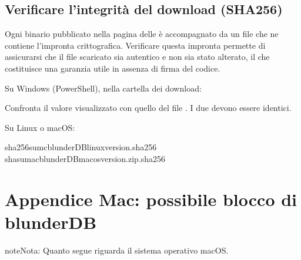 \documentclass[letterpaper,10pt,italian]{sphinxmanual}
\begin{document}
\subsection{Verificare l’integrità del download (SHA256)}
\label{\detokenize{annexe_windows_securite:verifier-l-integrite-du-telechargement-sha256}}
\sphinxAtStartPar
Ogni binario pubblicato nella pagina delle  è accompagnato da un file  che ne contiene l’impronta crittografica. Verificare questa impronta permette di assicurarsi che il file scaricato sia autentico e non sia stato alterato, il che costituisce una garanzia utile in assenza di firma del codice.

\sphinxAtStartPar
Su Windows (PowerShell), nella cartella dei download:

\begin{sphinxVerbatim}[commandchars=\\\{\}]
   
\end{sphinxVerbatim}

\sphinxAtStartPar
Confronta il valore visualizzato con quello del file . I due devono essere identici.

\sphinxAtStartPar
Su Linux o macOS:

\begin{sphinxVerbatim}[commandchars=\\\{\}]
sha256sum\PYGZhy{}cblunderDB\PYGZhy{}linux\PYGZhy{}\PYGZlt{}version\PYGZgt{}.sha256
shasum\PYGZhy{}a\PYGZhy{}cblunderDB\PYGZhy{}macos\PYGZhy{}\PYGZlt{}version\PYGZgt{}.zip.sha256
\end{sphinxVerbatim}

\sphinxstepscope


\section{Appendice Mac: possibile blocco di blunderDB}
\label{\detokenize{annexe_mac_securite:annexe-mac-blocage-eventuel-de-blunderdb}}\label{\detokenize{annexe_mac_securite:annexe-mac-malware}}\label{\detokenize{annexe_mac_securite::doc}}
\begin{sphinxadmonition}{note}{Nota:}
\sphinxAtStartPar
Quanto segue riguarda il sistema operativo macOS.
\end{sphinxadmonition}
\end{document}
